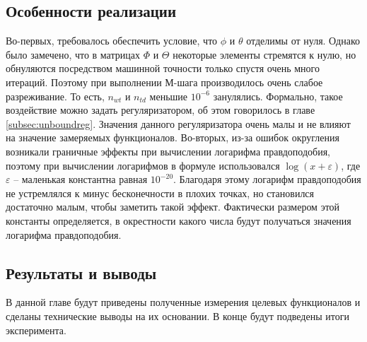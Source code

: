\documentclass[12pt]{article}
\begin{document}
\subsection{Особенности реализации}
\label{technical}
Во-первых, требовалось обеспечить условие, что $\phi$ и $\theta$ отделимы от нуля. Однако было замечено, что в матрицах $\Phi$ и $\Theta$ некоторые элементы стремятся к нулю, но обнуляются посредством машинной точности только спустя очень много итераций. Поэтому при выполнении М-шага производилось очень слабое разреживание. То есть, $n_{wt}$ и $n_{td}$ меньшие $10^{-6}$ занулялись. Формально, такое воздействие можно задать регуляризатором, об этом говорилось в главе \ref{subsec:unboundreg}. Значения данного регуляризатора очень малы и не влияют на значение замеряемых функционалов.
Во-вторых, из-за ошибок округления возникали граничные эффекты при вычислении логарифма правдоподобия, поэтому при вычислении логарифмов в формуле использовался $\log(x + \varepsilon)$, где $\varepsilon$ --  маленькая константна равная $10^{-20}$. Благодаря этому логарифм правдоподобия не устремлялся к минус бесконечности в плохих точках, но становился достаточно малым, чтобы заметить такой эффект. Фактически размером этой константы определяется, в окрестности какого числа будут получаться  значения логарифма правдоподобия.
\subsection{Результаты и выводы}
В данной главе будут приведены полученные измерения целевых функционалов и сделаны технические  выводы на их основании. В конце будут подведены итоги эксперимента.
\end{document}
